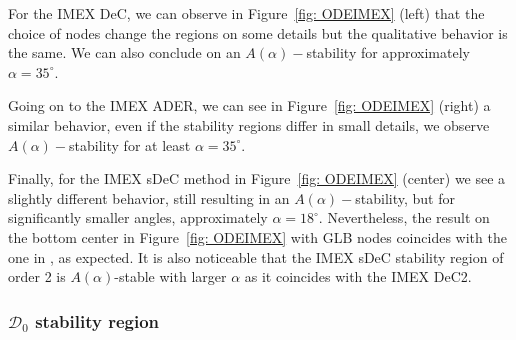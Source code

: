 For the IMEX DeC, we can observe in Figure~\ref{fig: ODEIMEX} (left) that the choice of nodes change the regions on some details but the qualitative behavior is the same. We can also conclude on an $A(\alpha)-$stability for approximately $\alpha=35^\circ$.

Going on to the IMEX ADER, we can see in Figure~\ref{fig: ODEIMEX} (right) a similar behavior, even if the stability regions differ in small details, we observe $A(\alpha)-$stability for at least $\alpha=35^\circ$.

Finally, for the IMEX sDeC method in Figure~\ref{fig: ODEIMEX} (center) we see a slightly different behavior, still resulting in an $A(\alpha)-$stability, but for significantly smaller angles, approximately $\alpha=18^\circ$. 
Nevertheless, the result on the bottom center in Figure~\ref{fig: ODEIMEX} with GLB nodes coincides with the one in \cite{minion2003dec}, as expected. 
It is also noticeable that the IMEX sDeC stability region of order 2 is $A(\alpha)$-stable with larger $\alpha$ as it coincides with the IMEX DeC2.


\subsubsection*{$\mathcal{D}_0$ stability region}

